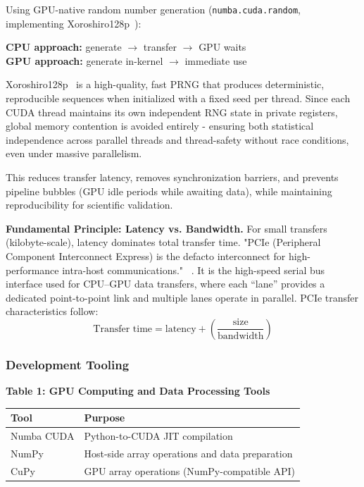\documentclass[a4paper,14pt]{extarticle}
\begin{document}
Using GPU-native random number generation (\texttt{numba.cuda.random}, implementing Xoroshiro128p~\cite{xoroshiro}):

\textbf{CPU approach:} generate $\rightarrow$ transfer $\rightarrow$ GPU waits\\
\textbf{GPU approach:} generate in-kernel $\rightarrow$ immediate use

Xoroshiro128p~\cite{xoroshiro} is a high-quality, fast PRNG that produces deterministic, reproducible sequences when initialized with a fixed seed per thread. Since each CUDA thread maintains its own independent RNG state in private registers, global memory contention is avoided entirely - ensuring both statistical independence across parallel threads and thread-safety without race conditions, even under massive parallelism.

This reduces transfer latency, removes synchronization barriers, and prevents pipeline bubbles (GPU idle periods while awaiting data), while maintaining reproducibility for scientific validation.

\textbf{Fundamental Principle: Latency vs. Bandwidth.} For small transfers (kilobyte-scale), latency dominates total transfer time. "PCIe (Peripheral Component Interconnect Express) is the
defacto interconnect for high-performance intra-host communications." ~\cite{hou2024pcie}. It is the high-speed serial bus interface used for CPU--GPU data transfers, where each ``lane'' provides a dedicated point-to-point link and multiple lanes operate in parallel. PCIe transfer characteristics follow:
\[
\text{Transfer time} = \text{latency} + \left(\frac{\text{size}}{\text{bandwidth}}\right)
\]

\subsubsection*{Development Tooling}

\begin{center}
\textbf{Table 1: GPU Computing and Data Processing Tools}\\[0.5em]
\begin{tabular}{@{}ll@{}}
\toprule
\textbf{Tool} & \textbf{Purpose} \\
\midrule
Numba CUDA & Python-to-CUDA JIT compilation \\
NumPy & Host-side array operations and data preparation \\
CuPy & GPU array operations (NumPy-compatible API) \\
\bottomrule
\end{tabular}
\end{center}
\end{document}
